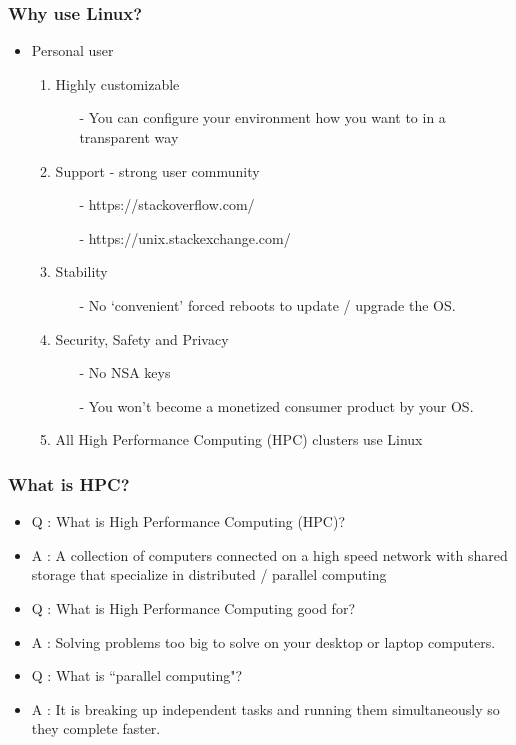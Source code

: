 \documentclass{beamer}
\begin{document}
\begin{frame}
\frametitle{Why use Linux?}
\begin{itemize}
    \item Personal user
    \begin{enumerate}
        \pause
        \item Highly customizable
        \begin{itemize}
            \pause
            \item[-] You can configure your environment how you want to in a transparent way
        \end{itemize}
        \pause
        \item Support - strong user community
        \begin{itemize}
            \item[-] https://stackoverflow.com/
            \pause
            \item[-] https://unix.stackexchange.com/
        \end{itemize}
        \pause
        \item Stability
        \begin{itemize}
            \pause
            \item[-] No `convenient' forced reboots to update / upgrade the OS.
        \end{itemize}
        \pause
        \item Security, Safety and Privacy
        \begin{itemize}
            \pause
            \item[-] No NSA keys
            \pause
            \item[-] You won't become a monetized consumer product by your OS.
        \end{itemize}
        \pause
        \item All High Performance Computing (HPC) clusters use Linux
    \end{enumerate}
\end{itemize}
\end{frame}


\begin{frame}
\frametitle{What is HPC?}
\begin{itemize}
    \item Q : What is High Performance Computing (HPC)?
    \pause
    \item A : A collection of computers connected on a high speed network with
              shared storage that specialize in distributed / parallel computing
    \pause
    \bigskip
    \item Q : What is High Performance Computing good for?
    \pause
    \item A : Solving problems too big to solve on your desktop or laptop computers.
    \pause
    \bigskip
    \item Q : What is ``parallel computing"?
    \pause
    \item A : It is breaking up independent tasks and running them simultaneously so they complete faster.
    \bigskip
\end{itemize}
\end{frame}
\end{document}
